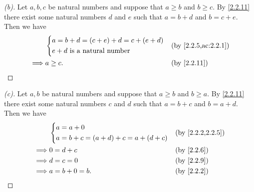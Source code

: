 \begin{proof}[(b)]
  Let \(a, b, c\) be natural numbers and suppose that \(a \geq b\) and \(b \geq c\).
  By \cref{2.2.11} there exist some natural numbers \(d\) and \(e\) such that \(a = b + d\) and \(b = c + e\).
  Then we have
  \begin{align*}
             & \begin{dcases}
                 a = b + d = (c + e) + d = c + (e + d) \\
                 e + d \text{ is a natural number}
               \end{dcases} &  & \by{2.2.5,ac:2.2.1}                     \\
    \implies & a \geq c.                                &  & \by{2.2.11}
  \end{align*}
\end{proof}

\begin{proof}[(c)]
  Let \(a, b\) be natural numbers and suppose that \(a \geq b\) and \(b \geq a\).
  By \cref{2.2.11} there exist some natural numbers \(c\) and \(d\) such that \(a = b + c\) and \(b = a + d\).
  Then we have
  \begin{align*}
             & \begin{dcases}
                 a = a + 0 \\
                 a = b + c = (a + d) + c = a + (d + c)
               \end{dcases} &  & \by{2.2.2,2.2.5}                  \\
    \implies & 0 = d + c                             &  & \by{2.2.6} \\
    \implies & d = c = 0                             &  & \by{2.2.9} \\
    \implies & a = b + 0 = b.                        &  & \by{2.2.2}
  \end{align*}
\end{proof}

